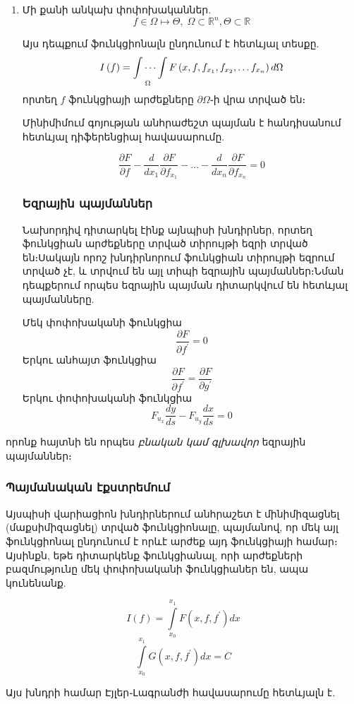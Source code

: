 \documentclass[fleqn, bachelor,subf,12pt,notitlepage]{disser}
\begin{document}
\begin{enumerate}
\item Մի քանի անկախ փոփոխականներ.
$$f \in \Omega \mapsto \Theta, \; \Omega \subset \mathbb{R}^{n}, \Theta \subset \mathbb{R}$$

\noindent Այս դեպքում ֆունկցիոնալն ընդունում է հետևյալ տեսքը.
$$I\left(f\right) = \idotsint \limits_{\Omega} F\left(x, f, f_{x_{1}}, f_{x_{2}}, \dots f_{x_{n} }\right)d\Omega$$
\noindent որտեղ $f$ ֆունկցիայի արժեքները $\partial \Omega$֊ի վրա տրված են։

\noindent Մինիմիմում գոյության անհրաժեշտ պայման է հանդիսանում հետևյալ դիֆերենցիալ հավասարումը.

$$\dfrac{\partial F}{\partial f} - \dfrac{d}{dx_{1}}\dfrac{\partial F}{\partial f_{x_{1}}} - \dots -\dfrac{d}{dx_{n}}\dfrac{\partial F}{\partial f_{x_{n}}}=0$$

\newpage
\subsubsection*{Եզրային պայմաններ}
Նախորդիվ դիտարկել էինք այնպիսի խնդիրներ, որտեղ ֆունկցիան արժեքները տրված տիրույթի եզրի տրված են։Սակայն որոշ խնդիրնորում ֆունկցիան տիրույթի եզրում տրված չէ, և տրվում են այլ տիպի եզրային պայմաններ։Նման դեպքերում որպես եզրային պայման դիտարկվում են հետևյալ պայմանները.

Մեկ փոփոխականի ֆունկցիա
$$\dfrac{\partial F}{\partial f^{'}}=0$$
Երկու անհայտ ֆունկցիա
$$\dfrac{\partial F}{\partial f^{'}}=\dfrac{\partial F}{\partial g^{'}}$$
Երկու փոփոխականի ֆունկցիա
$$F_{u_{x}}\dfrac{dy}{ds}-F_{u_{y}}\dfrac{dx}{ds}=0$$
\end{enumerate}

\noindent որոնք հայտնի են որպես \emph{բնական կամ գլխավոր}  եզրային պայմաններ։

\subsubsection*{Պայմանական էքստրեմում}
Այսպիսի վարիացիոն խնդիրներում անհրաշետ է մինիմիզացնել (մաքսիմիզացնել) տրված ֆունկցիոնալը, պայմանով, որ մեկ այլ ֆունկցիոնալ ընդունում է որևէ արժեք այդ ֆունկցիայի համար։ Այսինքն, եթե դիտարկենք ֆունկցիանալ, որի արժեքների բազմությունը մեկ փոփոխականի ֆունկցիաներ են, ապա կունենանք.

$$I\left(f\right)=\int \limits_{x_{0}}^{x_{1}} F\left(x, f, f^{'}\right)dx $$
$$\int \limits_{x_{0}}^{x_{1}} G\left(x, f, f^{'}\right)dx = C$$

Այս խնդրի համար Էյլեր֊Լագրանժի հավասարումը հետևյալն է.
\end{document}
